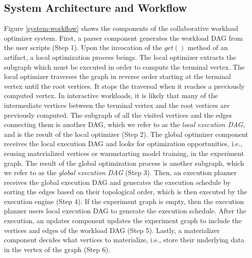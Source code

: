 \subsection{System Architecture and Workflow}
Figure \ref{system-workflow} shows the components of the collaborative workload optimizer system.
First, a parser component generates the workload DAG from the user scripts (Step 1).
Upon the invocation of the $get()$ method of an artifact, a local optimization process beings.
The local optimizer extracts the subgraph which must be executed in order to compute the terminal vertex.
The local optimizer traverses the graph in reverse order starting at the terminal vertex until the root vertices.
It stops the traversal when it reaches a previously computed vertex.
In interactive workloads, it is likely that many of the intermediate vertices between the terminal vertex and the root vertices are previously computed.
The subgraph of all the visited vertices and the edges connecting them is another DAG, which we refer to as the \textit{local execution DAG}, and is the result of the local optimizer (Step 2).
The global optimizer component receives the local execution DAG and looks for optimization opportunities, i.e., reusing materialized vertices or warmstarting model training, in the experiment graph.
The result of the global optimization process is another subgraph, which we refer to as the \textit{global execution DAG} (Step 3).
Then, an execution planner receives the global execution DAG and generates the execution schedule by sorting the edges based on their topological order, which is then executed by the execution engine (Step 4).
If the experiment graph is empty, then the execution planner users local execution DAG to generate the execution schedule.
After the execution, an updater component updates the experiment graph to include the vertices and edges of the workload DAG (Step 5).
Lastly, a materializer component decides what vertices to materialize, i.e., store their underlying data in the vertex of the graph (Step 6).

